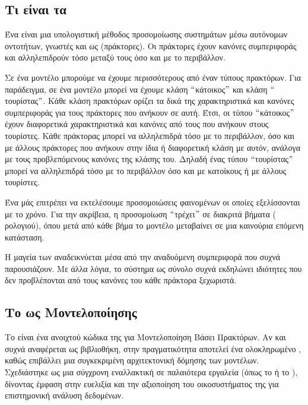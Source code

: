\subsection{Τι είναι τα }

Ένα  είναι μια υπολογιστική μέθοδος
προσομοίωσης συστημάτων μέσω αυτόνομων οντοτήτων, γνωστές και ως
 (πράκτορες). Οι πράκτορες έχουν κανόνες συμπεριφοράς
και αλληλεπιδρούν τόσο μεταξύ τους όσο και με το περιβάλλον. 

Σε ένα μοντέλο μπορούμε να έχουμε περισσότερους από έναν τύπους
πρακτόρων. Για παράδειγμα, σε ένα μοντέλο μπορεί να έχουμε κλάση
$``$κάτοικος$"$ και κλάση $``$τουρίστας$"$.
Κάθε κλάση πρακτόρων ορίζει τα δικά της χαρακτηριστικά και κανόνες
συμπεριφοράς για τους πράκτορες που ανήκουν σε αυτή. Έτσι, οι
 τύπου $``$κάτοικος$"$ έχουν διαφορετικά χαρακτηριστικά
και κανόνες από τους  που ανήκουν στους τουρίστες.
Κάθε πράκτορας μπορεί να αλληλεπιδρά τόσο με το περιβάλλον, όσο
και με άλλους πράκτορες που ανήκουν στην ίδια ή διαφορετική κλάση
με αυτόν, ανάλογα με τους προβλεπόμενους κανόνες της κλάσης του.
Δηλαδή ένας  τύπου $``$τουρίστας$"$ μπορεί να αλληλεπιδρά
τόσο με το περιβάλλον όσο και με κατοίκους ή με άλλους τουρίστες.

Ένα  μάς επιτρέπει να εκτελέσουμε
προσομοιώσεις φαινομένων οι οποίες εξελίσσονται με το χρόνο.
Για την ακρίβεια, η προσομοίωση $``$τρέχει$"$ σε διακριτά βήματα
( ρολογιού), όπου μετά από κάθε βήμα το μοντέλο
μεταβαίνει σε μια καινούρια επόμενη κατάσταση.

Η μαγεία των  αναδεικνύεται μέσα από την αναδυόμενη
συμπεριφορά που συχνά παρουσιάζουν. Με άλλα λόγια, το σύστημα ως
σύνολο συχνά εκδηλώνει ιδιότητες που δεν προβλέπονται από τους
κανόνες του κάθε πράκτορα ξεχωριστά.

\subsection{Το  ως  Μοντελοποίησης}

Το  είναι ένα  ανοιχτού κώδικα της
 για Μοντελοποίηση Βάσει Πρακτόρων. Αν και συχνά
αναφέρεται ως βιβλιοθήκη, στην πραγματικότητα αποτελεί ένα
ολοκληρωμένο , καθώς επιβάλλει μια συγκεκριμένη
αρχιτεκτονική δόμησης των μοντέλων. Σχεδιάστηκε ως μια σύγχρονη
εναλλακτική σε παλαιότερα εργαλεία (όπως το  ή το
), δίνοντας έμφαση στην ευελιξία και την αξιοποίηση
του οικοσυστήματος της  για επιστημονική ανάλυση
δεδομένων.

